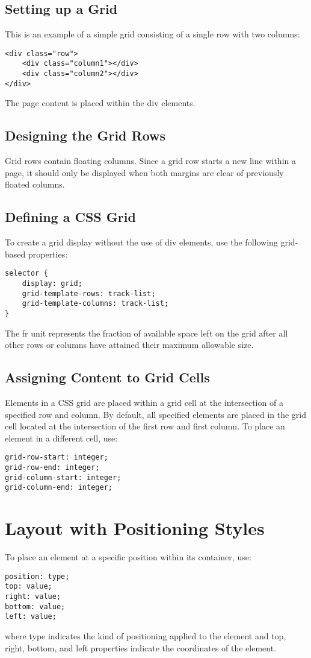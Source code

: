 \documentclass{article}
\begin{document}
\subsection{Setting up a Grid}
This is an example of a simple grid consisting of a single row with two columns:
\begin{lstlisting}
<div class="row">
    <div class="column1"></div>
    <div class="column2"></div>
</div>
\end{lstlisting}
The page content is placed within the div elements.

\subsection{Designing the Grid Rows}
Grid rows contain floating columns. Since a grid row starts a new line within a page, it should only be displayed when both margins are clear of previously floated columns.

\subsection{Defining a CSS Grid}
To create a grid display without the use of div elements, use the following grid-based properties:
\begin{lstlisting}
selector {
    display: grid;
    grid-template-rows: track-list;
    grid-template-columns: track-list;
}
\end{lstlisting}
The fr unit represents the fraction of available space left on the grid after all other rows or columns have attained their maximum allowable size.

\subsection{Assigning Content to Grid Cells}
Elements in a CSS grid are placed within a grid cell at the intersection of a specified row and column. By default, all specified elements are placed in the grid cell located at the intersection of the first row and first column. To place an element in a different cell, use:
\begin{lstlisting}
grid-row-start: integer;
grid-row-end: integer;
grid-column-start: integer;
grid-column-end: integer;
\end{lstlisting}

\section{Layout with Positioning Styles}
To place an element at a specific position within its container, use:
\begin{lstlisting}
position: type;
top: value;
right: value;
bottom: value;
left: value;
\end{lstlisting}
where type indicates the kind of positioning applied to the element and top, right, bottom, and left properties indicate the coordinates of the element.
\end{document}
